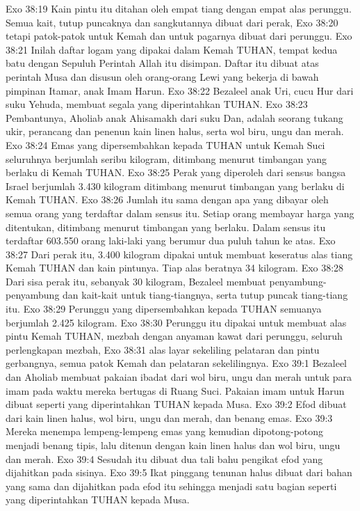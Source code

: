 Exo 38:19  Kain pintu itu ditahan oleh empat tiang dengan empat alas perunggu. Semua kait, tutup puncaknya dan sangkutannya dibuat dari perak,
Exo 38:20  tetapi patok-patok untuk Kemah dan untuk pagarnya dibuat dari perunggu.
Exo 38:21  Inilah daftar logam yang dipakai dalam Kemah TUHAN, tempat kedua batu dengan Sepuluh Perintah Allah itu disimpan. Daftar itu dibuat atas perintah Musa dan disusun oleh orang-orang Lewi yang bekerja di bawah pimpinan Itamar, anak Imam Harun.
Exo 38:22  Bezaleel anak Uri, cucu Hur dari suku Yehuda, membuat segala yang diperintahkan TUHAN.
Exo 38:23  Pembantunya, Aholiab anak Ahisamakh dari suku Dan, adalah seorang tukang ukir, perancang dan penenun kain linen halus, serta wol biru, ungu dan merah.
Exo 38:24  Emas yang dipersembahkan kepada TUHAN untuk Kemah Suci seluruhnya berjumlah seribu kilogram, ditimbang menurut timbangan yang berlaku di Kemah TUHAN.
Exo 38:25  Perak yang diperoleh dari sensus bangsa Israel berjumlah 3.430 kilogram ditimbang menurut timbangan yang berlaku di Kemah TUHAN.
Exo 38:26  Jumlah itu sama dengan apa yang dibayar oleh semua orang yang terdaftar dalam sensus itu. Setiap orang membayar harga yang ditentukan, ditimbang menurut timbangan yang berlaku. Dalam sensus itu terdaftar 603.550 orang laki-laki yang berumur dua puluh tahun ke atas.
Exo 38:27  Dari perak itu, 3.400 kilogram dipakai untuk membuat keseratus alas tiang Kemah TUHAN dan kain pintunya. Tiap alas beratnya 34 kilogram.
Exo 38:28  Dari sisa perak itu, sebanyak 30 kilogram, Bezaleel membuat penyambung-penyambung dan kait-kait untuk tiang-tiangnya, serta tutup puncak tiang-tiang itu.
Exo 38:29  Perunggu yang dipersembahkan kepada TUHAN semuanya berjumlah 2.425 kilogram.
Exo 38:30  Perunggu itu dipakai untuk membuat alas pintu Kemah TUHAN, mezbah dengan anyaman kawat dari perunggu, seluruh perlengkapan mezbah,
Exo 38:31  alas layar sekeliling pelataran dan pintu gerbangnya, semua patok Kemah dan pelataran sekelilingnya.
Exo 39:1  Bezaleel dan Aholiab membuat pakaian ibadat dari wol biru, ungu dan merah untuk para imam pada waktu mereka bertugas di Ruang Suci. Pakaian imam untuk Harun dibuat seperti yang diperintahkan TUHAN kepada Musa.
Exo 39:2  Efod dibuat dari kain linen halus, wol biru, ungu dan merah, dan benang emas.
Exo 39:3  Mereka menempa lempeng-lempeng emas yang kemudian dipotong-potong menjadi benang tipis, lalu ditenun dengan kain linen halus dan wol biru, ungu dan merah.
Exo 39:4  Sesudah itu dibuat dua tali bahu pengikat efod yang dijahitkan pada sisinya.
Exo 39:5  Ikat pinggang tenunan halus dibuat dari bahan yang sama dan dijahitkan pada efod itu sehingga menjadi satu bagian seperti yang diperintahkan TUHAN kepada Musa.
